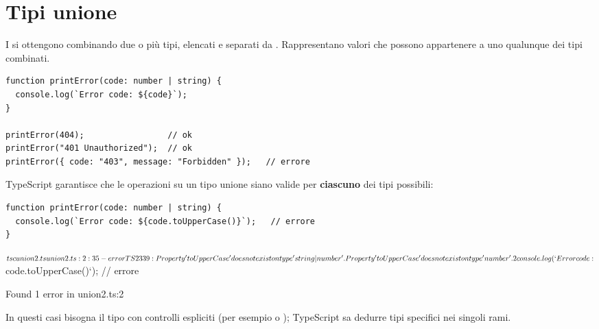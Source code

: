 \section{Tipi unione}

I  si ottengono combinando due o più tipi, elencati e separati
da \code{|}. Rappresentano valori che possono appartenere a uno qualunque dei
tipi combinati.

\begin{lstlisting}[style=ts, name=union.ts]
function printError(code: number | string) {
  console.log(`Error code: ${code}`);
}

printError(404);                 // ok
printError("401 Unauthorized");  // ok
printError({ code: "403", message: "Forbidden" });   // errore
\end{lstlisting}


TypeScript garantisce che le operazioni su un tipo unione siano valide per
\textbf{ciascuno} dei tipi possibili:

\begin{lstlisting}[style=ts, name=union2.ts]
function printError(code: number | string) {
  console.log(`Error code: ${code.toUpperCase()}`);   // errore
}
\end{lstlisting}

\begin{console}[Terminale]
$ tsc union2.ts
union2.ts:2:35 - error TS2339: Property 'toUpperCase' does not exist on type 'string | number'.
  Property 'toUpperCase' does not exist on type 'number'.

2   console.log(`Error code: ${code.toUpperCase()}`);   // errore
                                    ~~~~~~~~~~~


Found 1 error in union2.ts:2

\end{console}

In questi casi bisogna  il tipo con controlli espliciti (per
esempio  o ); TypeScript sa dedurre tipi
specifici nei singoli rami.

